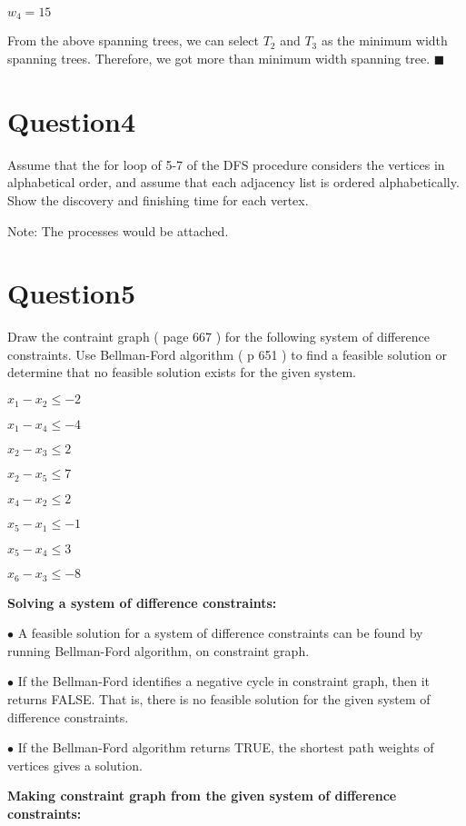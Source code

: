 \documentclass[12]{article}
\begin{document}
$w_4 = 15$

From  the above spanning trees, we can select $T_2$ and $T_3$ as the minimum width spanning trees. Therefore, we got more than minimum width spanning tree. $\blacksquare$



\section{Question4} 

Assume that the for loop of  5-7 of the DFS procedure considers the vertices in alphabetical order, and assume that each adjacency list is ordered alphabetically. Show the discovery and finishing time for each vertex. 

Note: The processes would be attached.


\section{Question5} 

Draw the contraint graph ( page 667 ) for the following system of difference constraints. Use Bellman-Ford algorithm ( p 651 ) to find a feasible solution or determine that no feasible solution exists for the given system.

$x_1 - x_2 \leqslant -2$

$x_1 - x_4 \leqslant -4$

$x_2 - x_3 \leqslant  2$

$x_2 - x_5 \leqslant 7$

$x_4 - x_2 \leqslant 2$

$x_5 - x_1 \leqslant -1$

$x_5 - x_4 \leqslant 3$

$x_6 - x_3 \leqslant -8$

\textbf{ Solving a system of difference constraints:} 

$\bullet$ A feasible solution for a system  of difference constraints can be found by running Bellman-Ford algorithm, on constraint graph.

$\bullet$ If the Bellman-Ford identifies a negative cycle in constraint graph, then it returns FALSE. That is, there is no feasible solution for the given system of difference constraints.

$\bullet$ If the Bellman-Ford algorithm returns TRUE, the shortest path weights of vertices gives a solution.
 
\textbf{ Making constraint graph from the given system of difference constraints:}
\end{document}
